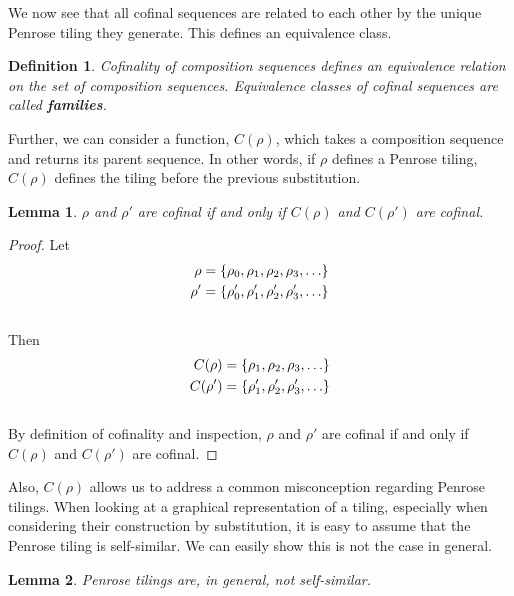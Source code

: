 \documentclass[
  oneside,
  11pt, a4paper,
  footinclude=true,
  headinclude=true,
  cleardoublepage=empty
]{scrbook}
\newtheorem{mydef}{Definition}
\newtheorem{mylem}{Lemma}
\begin{document}
We now see that all cofinal sequences are related to each other by the unique Penrose tiling they generate. This defines an equivalence class.

\begin{mydef}
Cofinality of composition sequences defines an equivalence relation on the set of composition sequences. Equivalence classes of cofinal sequences are called \textbf{families}.
\end{mydef}

Further, we can consider a function, $C(\rho)$, which takes a composition sequence and returns its parent sequence. In other words, if $\rho$ defines a Penrose tiling, $C(\rho)$ defines the tiling before the previous substitution. 

\begin{mylem}
$\rho$ and $\rho'$ are cofinal if and only if $C(\rho)$ and $C(\rho')$ are cofinal.
\end{mylem}

\begin{proof}
Let 
\begin{equation*}\begin{split}
\rho=\{\rho_0,\rho_1,\rho_2,\rho_3,\mathellipsis\}\\
\rho'=\{\rho'_0,\rho'_1,\rho'_2,\rho'_3,\mathellipsis\}
\end{split}
\end{equation*}\\
Then 
\begin{equation*}
\begin{split}
C(\rho)=\{\rho_1,\rho_2,\rho_3,\mathellipsis\}\\
C(\rho')=\{\rho'_1,\rho'_2,\rho'_3,\mathellipsis\}
\end{split}
\end{equation*}\\
By definition of cofinality and inspection, $\rho$ and $\rho'$ are cofinal if and only if $C(\rho)$ and $C(\rho')$ are cofinal.
\end{proof}

Also, $C(\rho)$ allows us to address a common misconception regarding Penrose tilings. When looking at a graphical representation of a tiling, especially when considering their construction by substitution, it is easy to assume that the Penrose tiling is self-similar. We can easily show this is not the case in general.

\begin{mylem}
Penrose tilings are, in general, not self-similar.
\end{mylem}
\end{document}
